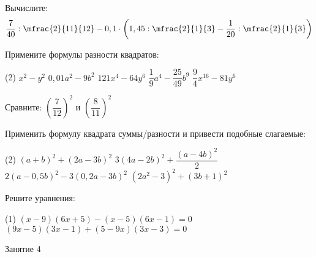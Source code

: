 \begin{class}[number=3]
	\begin{listofex}
		\item Вычислите: \[ \dfrac{7}{40} : \mfrac{2}{11}{12} - 0,1 \cdot \left( 1,45 : \mfrac{2}{1}{3} - \dfrac{1}{20} : \mfrac{2}{1}{3} \right) \]
		\item Примените формулы разности квадратов:
		\begin{tasks}(2)
			\task \( x^2-y^2 \)
			\task \( 0,01a^2-9b^2 \)
			\task \( 121x^4-64y^6 \)
			\task \( \dfrac{1}{9}a^4-\dfrac{25}{49}b^9 \)
			\task \( \dfrac{9}{4}x^{16}-81y^6 \)
		\end{tasks}
		\item Сравните: \( \left( \dfrac{7}{12} \right)^2\) и \( \left( \dfrac{8}{11} \right)^2\)
		\item Применить формулу квадрата суммы/разности и привести подобные слагаемые:
		\begin{tasks}(2)
			\task \( (a+b)^2+(2a-3b)^2 \)
			\task \( 3(4a-2b)^2+\dfrac{(a-4b)^2}{2} \)
			\task \( 2(a-0,5b)^2-3(0,2a-3b)^2 \)
			\task \( (2a^2-3)^2+(3b+1)^2 \)
		\end{tasks}
		\item Решите уравнения:
		\begin{tasks}(1)
			\task \( (x-9)(6x+5)-(x-5)(6x-1)=0 \)
			\task \( (9x-5)(3x-1)+(5-9x)(3x-3)=0 \)
		\end{tasks}
	\end{listofex}
\end{class}

\begin{class}[number=4]
	\begin{listofex}
		\item Занятие 4
	\end{listofex}
\end{class}

